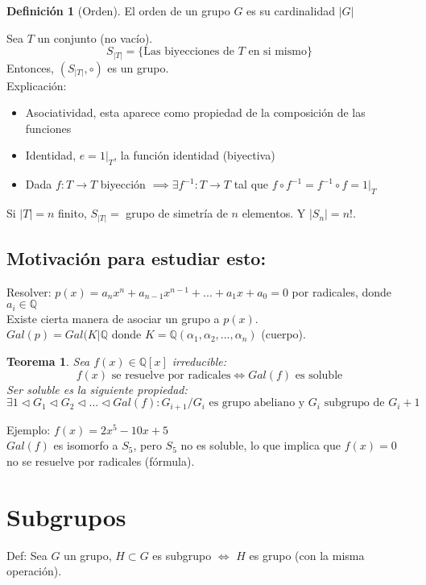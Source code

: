 \documentclass[11pt]{book}
\newtheorem{thm}{Teorema}[section]
\theoremstyle{definition}
\newtheorem{defn}{Definición}[section]
\begin{document}
\begin{defn}[Orden]
El orden de un grupo $G$ es su cardinalidad $|G|$
\end{defn}
Sea $T$ un conjunto (no vací­o).
\[
S_{|T|}=\{\textrm{Las biyecciones de } T \textrm{ en si mismo}\}
\]
Entonces, $(S_{|T|},\circ)$ es un grupo.\\
Explicación:
\begin{itemize}
	\item Asociatividad, esta aparece como propiedad de la composición de las funciones
	
	\item Identidad, $e=1|_T$, la función identidad (biyectiva)
	
	\item Dada $f:T\rightarrow T$ biyección $\implies \exists f^{-1}:T\rightarrow T$ tal que $f\circ f^{-1}=f^{-1}\circ f=1|_T$
\end{itemize}

Si $|T|=n$ finito, $S_{|T|}=$ grupo de simetrí­a de $n$ elementos. Y $|S_n|=n!$.

\subsection{Motivación para estudiar esto:}

Resolver: $p(x)=a_nx^n+a_{n-1}x^{n-1}+...+a_1x+a_0=0$ por radicales, donde $a_i\in\mathbb{Q}$\\
Existe cierta manera de asociar un grupo a $p(x)$.\\
$Gal(p)=Gal(K|\mathbb{Q}$ donde $K=\mathbb{Q}(\alpha_1,\alpha_2,...,\alpha_n)$ (cuerpo).
\begin{thm}
Sea $f(x)\in \mathbb{Q}[x]$ irreducible:
\[
f(x)\textrm{ se resuelve por radicales}\iff Gal(f)\textrm{ es soluble}
\]
Ser soluble es la siguiente propiedad:
\[
\exists 1\triangleleft G_1\triangleleft G_2\triangleleft ...\triangleleft Gal(f):G_{i+1}/G_i\textrm{ es grupo abeliano y } G_i\textrm{ subgrupo de } G_i+1
\]
\end{thm}
Ejemplo: $f(x)=2x^5-10x+5$\\
$Gal(f)$ es isomorfo a $S_5$, pero $S_5$ no es soluble, lo que implica que $f(x)=0$ no se resuelve por radicales (fórmula).

\section{Subgrupos}
Def: Sea $G$ un grupo, $H\subset G$ es subgrupo $\iff$ $H$ es grupo (con la misma operación).
\end{document}
